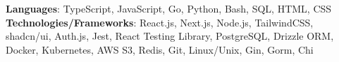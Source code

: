 \textbf{Languages}: TypeScript, JavaScript, Go, Python, Bash, SQL, HTML, CSS \\
\textbf{Technologies/Frameworks}: React.js, Next.js, Node.js, TailwindCSS, shadcn/ui, Auth.js, Jest, React Testing Library, PostgreSQL, Drizzle ORM, Docker, Kubernetes, AWS S3, Redis, Git, Linux/Unix, Gin, Gorm, Chi